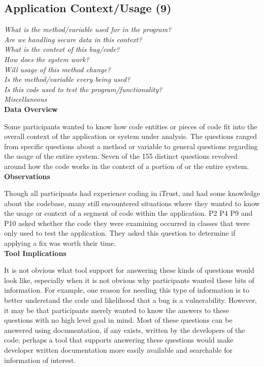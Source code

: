 \documentclass[conference]{IEEEtran}
\begin{document}

\noindent\subsection{\textbf{Application Context/Usage (9)}}\label{acu}

\noindent\emph{What is the method/variable used for in the program?} \\
\emph{Are we handling secure data in this context?} \\
\emph{What is the context of this bug/code?} \\
\emph{How does the system work?} \\
\emph{Will usage of this method change?} \\
\emph{Is the method/variable every being used?} \\
\emph{Is this code used to test the program/functionality?} \\
\emph{Miscellaneous} \\


\noindent\textbf{Data Overview}

Some participants wanted to know how code entities or pieces of code fit into the overall context of the application or system under analysis. 
The questions ranged from specific questions about a method or variable to general questions regarding the usage of the entire system. 
Seven of the 155 distinct questions revolved around how the code works in the context of a portion of or the entire system.
\\

\noindent\textbf{Observations}

Though all participants had experience coding in iTrust, and had some knowledge about the codebase, many still encountered situations where they wanted to know the usage or context of a segment of code within the application. 
P2 P4 P9 and P10 asked whether the code they were examining occurred in classes that were only used to test the application. They asked this question to determine if applying a fix was worth their time.
\\

\noindent\textbf{Tool Implications}

It is not obvious what tool support for answering these kinds of questions would look like, especially when it is not obvious why participants wanted these bits of information. 
For example, one reason for needing this type of information is to better understand the code and likelihood that a bug is a vulnerability. 
However, it may be that participants merely wanted to know the answers to these questions with no high level goal in mind.
Most of these questions can be answered using documentation, if any exists, written by the developers of the code; perhaps a tool that supports answering these questions would make developer written documentation more easily available and searchable for information of interest.
\end{document}
